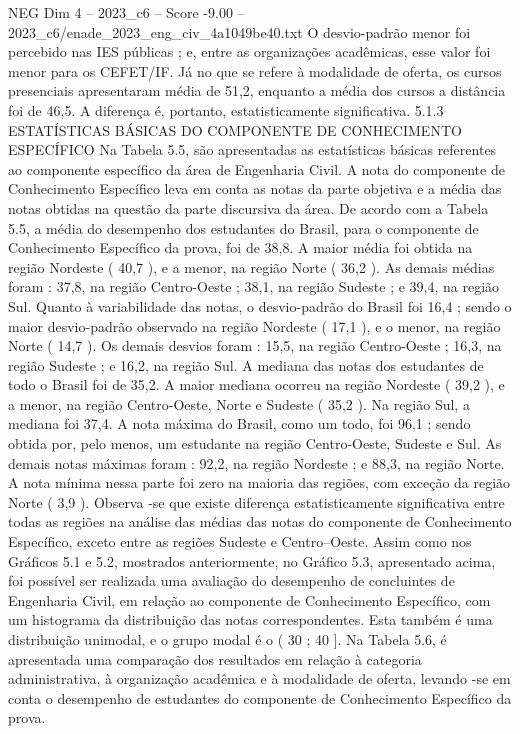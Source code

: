 \begin{textsample}{NEG Dim 4 – 2023\_c6 – Score -9.00 – 2023\_c6/enade\_2023\_eng\_civ\_4a1049be40.txt}
O desvio-padrão menor foi percebido nas IES públicas ; e, entre as organizações acadêmicas, esse valor foi menor para os CEFET/IF.
Já no que se refere à modalidade de oferta, os cursos presenciais apresentaram média de 51,2, enquanto a média dos cursos a distância foi de 46,5.
A diferença é, portanto, estatisticamente significativa. 5.1.3 ESTATÍSTICAS BÁSICAS DO COMPONENTE DE CONHECIMENTO ESPECÍFICO Na Tabela 5.5, são apresentadas as estatísticas básicas referentes ao componente específico da área de Engenharia Civil.
A nota do componente de Conhecimento Específico leva em conta as notas da parte objetiva e a média das notas obtidas na questão da parte discursiva da área.
De acordo com a Tabela 5.5, a média do desempenho dos estudantes do Brasil, para o componente de Conhecimento Específico da prova, foi de 38,8.
A maior média foi obtida na região Nordeste ( 40,7 ), e a menor, na região Norte ( 36,2 ).
As demais médias foram : 37,8, na região Centro-Oeste ; 38,1, na região Sudeste ; e 39,4, na região Sul.
Quanto à variabilidade das notas, o desvio-padrão do Brasil foi 16,4 ; sendo o maior desvio-padrão observado na região Nordeste ( 17,1 ), e o menor, na região Norte ( 14,7 ).
Os demais desvios foram : 15,5, na região Centro-Oeste ; 16,3, na região Sudeste ; e 16,2, na região Sul.
A mediana das notas dos estudantes de todo o Brasil foi de 35,2.
A maior mediana ocorreu na região Nordeste ( 39,2 ), e a menor, na região Centro-Oeste, Norte e Sudeste ( 35,2 ).
Na região Sul, a mediana foi 37,4.
A nota máxima do Brasil, como um todo, foi 96,1 ; sendo obtida por, pelo menos, um estudante na região Centro-Oeste, Sudeste e Sul.
As demais notas máximas foram : 92,2, na região Nordeste ; e 88,3, na região Norte.
A nota mínima nessa parte foi zero na maioria das regiões, com exceção da região Norte ( 3,9 ).
Observa -se que existe diferença estatisticamente significativa entre todas as regiões na análise das médias das notas do componente de Conhecimento Específico, exceto entre as regiões Sudeste e Centro--Oeste.
Assim como nos Gráficos 5.1 e 5.2, mostrados anteriormente, no Gráfico 5.3, apresentado acima, foi possível ser realizada uma avaliação do desempenho de concluintes de Engenharia Civil, em relação ao componente de Conhecimento Específico, com um histograma da distribuição das notas correspondentes.
Esta também é uma distribuição unimodal, e o grupo modal é o ( 30 ; 40 ].
Na Tabela 5.6, é apresentada uma comparação dos resultados em relação à categoria administrativa, à organização acadêmica e à modalidade de oferta, levando -se em conta o desempenho de estudantes do componente de Conhecimento Específico da prova.

\end{textsample}

